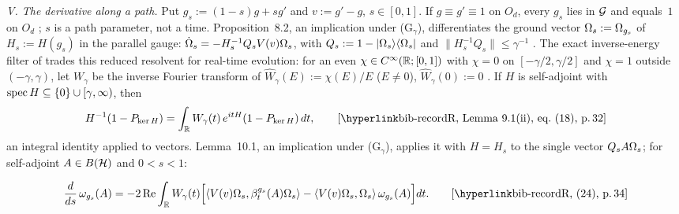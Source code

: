 \emph{V. The derivative along a path.} Put $g_s:=(1-s)g+sg'$ and $v:=g'-g$,
$s\in[0,1]$. If $g\equiv g'\equiv1$ on $O_d$, every $g_s$ lies in $\mathcal{G}$ and equals~$1$
on $O_d$ ; $s$ is a path parameter, not a time.
Proposition~8.2, an implication under (G$_\gamma$), differentiates the ground vector
$\Omega_s:=\Omega_{g_s}$ of $H_s:=H(g_s)$ in the parallel gauge:
$\dot{\Omega}_s=-H_s^{-1}Q_sV(v)\Omega_s$, with $Q_s:=1-|\Omega_s\rangle\langle\Omega_s|$ and
$\|H_s^{-1}Q_s\|\le\gamma^{-1}$ . The exact
inverse-energy filter of  trades this reduced resolvent for real-time
evolution: for an even $\chi\in C^\infty(\mathbb{R};[0,1])$ with $\chi=0$ on
$[-\gamma/2,\gamma/2]$ and $\chi=1$ outside $(-\gamma,\gamma)$, let $W_\gamma$ be the
inverse Fourier transform of $\widehat W_\gamma(E):=\chi(E)/E$ ($E\ne0$),
$\widehat W_\gamma(0):=0$ . If $H$ is self-adjoint with
$\operatorname{spec} H\subseteq\{0\}\cup[\gamma,\infty)$, then
\begin{equation*}
 H^{-1}(1-P_{\ker H})=\int_\R W_\gamma(t)\,e^{itH}(1-P_{\ker H})\,dt ,
 \tag*{\rec{Lemma~9.1(ii), eq.~(18)}{32}}
\end{equation*}
an integral identity applied to vectors. Lemma~10.1, an implication under (G$_\gamma$),
applies it with $H=H_s$ to the single vector $Q_sA\Omega_s$; for self-adjoint
$A\in B(\mathcal{H})$ and $0<s<1$:
\begin{checkpoint}
\vspace{-1ex}
\begin{equation*}
 \frac d{ds}\,\omega_{g_s}(A)
 =-2\,\mathrm{Re}\int_\R W_\gamma(t)
 \Bigl[\ip{V(v)\Om_s}{\beta^{g_s}_t(A)\Om_s}
 -\ip{V(v)\Om_s}{\Om_s}\,\omega_{g_s}(A)\Bigr]dt .
 \tag*{\rec{(24)}{34}}
\end{equation*}
\end{checkpoint}

